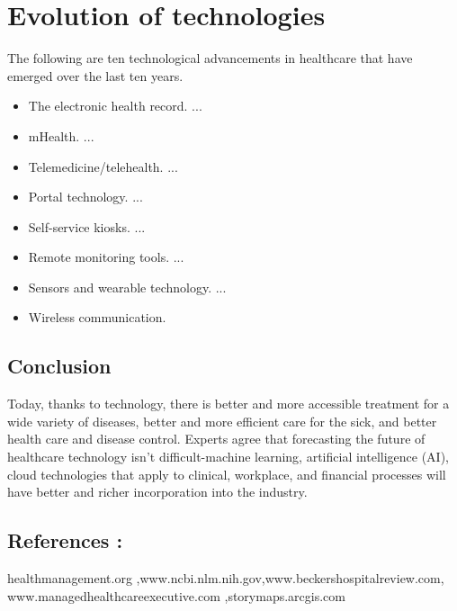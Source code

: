 \documentclass[11pt]{article}
\begin{document}
\section{Evolution of technologies}
\Large The following are ten technological advancements in healthcare that have emerged over the last ten years.
\begin{itemize}


\begin{figure}[h]
\texttt{[image: health.png]}
\end{figure}

\item \large The electronic health record. ...
\item \large mHealth. ...
\item \large Telemedicine/telehealth. ...
\item \large Portal technology. ...
\item \large Self-service kiosks. ...
\item \large Remote monitoring tools. ...
\item \large Sensors and wearable technology. ...
\item \large Wireless communication.

\end{itemize}



\subsection{Conclusion}
  
  Today, thanks to technology, there is better and more accessible treatment for a wide variety of diseases, better and more efficient care for the sick, and better health care and disease control.
  Experts agree that forecasting the future of healthcare technology isn't difficult-machine learning, artificial intelligence (AI), cloud technologies that apply to clinical, workplace, and financial processes will have better and richer incorporation into the industry.
  
\subsection{References :}  \Large healthmanagement.org ,www.ncbi.nlm.nih.gov,www.beckershospitalreview.com,
www.managedhealthcareexecutive.com
,storymaps.arcgis.com
 
\end{document}
